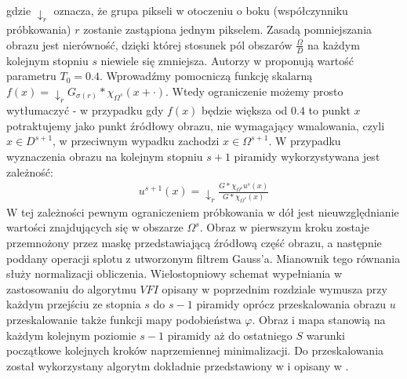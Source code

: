 \documentclass[a4paper,12pt,twoside,openany]{report}
\begin{document}
gdzie $\downarrow_r$ oznacza, że grupa pikseli w otoczeniu o boku (współczynniku próbkowania) $r$ zostanie zastąpiona jednym pikselem. Zasadą pomniejszania obrazu jest nierówność, dzięki której stosunek pól obszarów $\frac{\Omega}{D}$ na każdym kolejnym stopniu $s$ niewiele się zmniejsza. Autorzy w \cite{arias2011variational} proponują wartość parametru $T_0=0.4$. Wprowadźmy pomocniczą funkcję skalarną $f(x) = \downarrow_r G_{\sigma(r)}\ast\chi_{\Omega^s}(x + \cdot)$. Wtedy ograniczenie możemy prosto wytłumaczyć - w przypadku gdy $f(x)$ będzie większa od $0.4$ to punkt $x$ potraktujemy jako punkt źródłowy obrazu, nie wymagający wmalowania, czyli $x \in D^{s+1}$, w przeciwnym wypadku zachodzi $x \in \Omega^{s+1}.$ W przypadku wyznaczenia obrazu na kolejnym stopniu $s+1$ piramidy wykorzystywana jest zależność:
\begin{align}
u^{s+1}(x)= \downarrow_r \frac{G \ast \chi_{\Omega^s} u^s(x)}{G \ast \chi_{\Omega^s}(x)}
\end{align}
W tej zależności pewnym ograniczeniem próbkowania w dół jest nieuwzględnianie wartości znajdujących się w obszarze $\Omega^s$. Obraz w pierwszym kroku zostaje przemnożony przez maskę przedstawiającą źródłową część obrazu, a następnie poddany operacji splotu z utworzonym filtrem Gauss'a. Mianownik tego równania służy normalizacji obliczenia. Wielostopniowy schemat wypełniania w zastosowaniu do algorytmu $VFI$ opisany w poprzednim rozdziale wymusza przy każdym przejściu ze stopnia $s$ do $s-1$ piramidy oprócz przeskalowania obrazu $u$ przeskalowanie także funkcji mapy podobieństwa $\varphi$. Obraz i mapa stanowią na każdym kolejnym poziomie $s-1$ piramidy aż do ostatniego $S$ warunki początkowe kolejnych kroków naprzemiennej minimalizacji. Do przeskalowania  został wykorzystany algorytm dokładnie przedstawiony w \cite{wexler2007space} i opisany w \cite{arias2011variational}.
\end{document}
